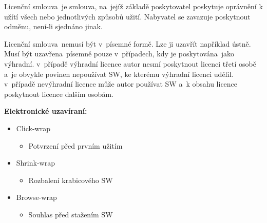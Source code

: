 Licenční smlouva~je smlouva, na~jejíž základě poskytovatel poskytuje oprávnění k užítí všech nebo jednotlivých způsobů užití. Nabyvatel se zavazuje poskytnout odměnu, není-li sjednáno jinak.

Licenční smlouva~nemusí být v~písemné formě. Lze ji uzavřít například ústně. Musí být uzavřena~písemně pouze v~případech, kdy je poskytována~jako výhradní. v~případě výhradní licence autor nesmí poskytnout licenci třetí osobě a~je obvykle povinen nepoužívat SW, ke kterému výhradní licenci udělil. v~případě nevýhradní licence může autor používat SW a~k obsahu licence poskytnout licence dalším osobám.
\newline

\noindent\textbf{Elektronické uzavíraní:}
\begin{itemize}[noitemsep]
    \item Click-wrap
          \begin{itemize}[noitemsep]
              \item Potvrzení před prvním užitím
          \end{itemize}
    \item Shrink-wrap
          \begin{itemize}[noitemsep]
              \item Rozbalení krabicového SW
          \end{itemize}
    \item Browse-wrap
          \begin{itemize}[noitemsep]
              \item Souhlas před stažením SW
          \end{itemize}
\end{itemize}

